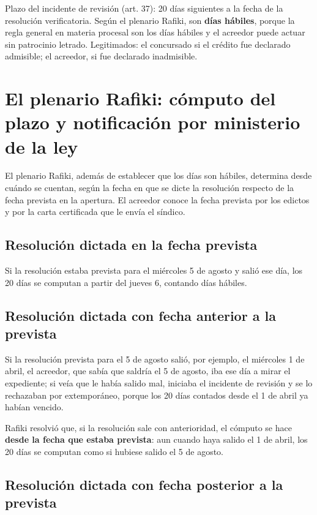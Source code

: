 \documentclass[12pt,oneside]{book}
\begin{document}
\begin{important}
Plazo del incidente de revisión (art. 37): 20 días siguientes a la fecha de la resolución verificatoria. Según el plenario Rafiki, son \textbf{días hábiles}, porque la regla general en materia procesal son los días hábiles y el acreedor puede actuar sin patrocinio letrado. Legitimados: el concursado si el crédito fue declarado admisible; el acreedor, si fue declarado inadmisible.
\end{important}

\section{El plenario Rafiki: cómputo del plazo y notificación por ministerio de la ley}

El plenario Rafiki, además de establecer que los días son hábiles, determina desde cuándo se cuentan, según la fecha en que se dicte la resolución respecto de la fecha prevista en la apertura. El acreedor conoce la fecha prevista por los edictos y por la carta certificada que le envía el síndico.

\subsection{Resolución dictada en la fecha prevista}

Si la resolución estaba prevista para el miércoles 5 de agosto y salió ese día, los 20 días se computan a partir del jueves 6, contando días hábiles.

\subsection{Resolución dictada con fecha anterior a la prevista}

Si la resolución prevista para el 5 de agosto salió, por ejemplo, el miércoles 1 de abril, el acreedor, que sabía que saldría el 5 de agosto, iba ese día a mirar el expediente; si veía que le había salido mal, iniciaba el incidente de revisión y se lo rechazaban por extemporáneo, porque los 20 días contados desde el 1 de abril ya habían vencido.

Rafiki resolvió que, si la resolución sale con anterioridad, el cómputo se hace \textbf{desde la fecha que estaba prevista}: aun cuando haya salido el 1 de abril, los 20 días se computan como si hubiese salido el 5 de agosto.

\subsection{Resolución dictada con fecha posterior a la prevista}
\end{document}
